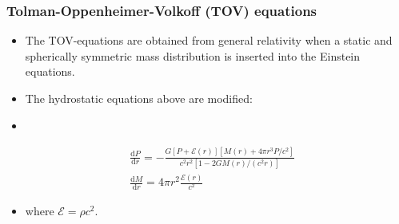 \documentclass{beamer}
\begin{document}
\begin{frame}
\frametitle{Tolman-Oppenheimer-Volkoff (TOV) equations}
\begin{itemize}
    \item The TOV-equations are obtained from general relativity when a static and spherically symmetric mass distribution is inserted into the Einstein equations.
    \item The hydrostatic equations above are modified:
    \item[]
\end{itemize}
\begin{equation*}
    \begin{split}
        &\frac{\text{d}P}{\text{d}r} = -\frac{G\left[P+\mathcal{E}(r)\right]\left[M(r)+4\pi r^3P/c^2\right]}{c^2r^2[1-2GM(r)/(c^2r)]} \\ 
        &\frac{\text{d}M}{\text{d}r} = 4\pi r^2\frac{\mathcal{E}(r)}{c^2}
    \end{split}
\end{equation*}
\begin{itemize}
    \item[] where $\mathcal{E} = \rho c^2$.
\end{itemize}
\end{frame}

\end{document}
